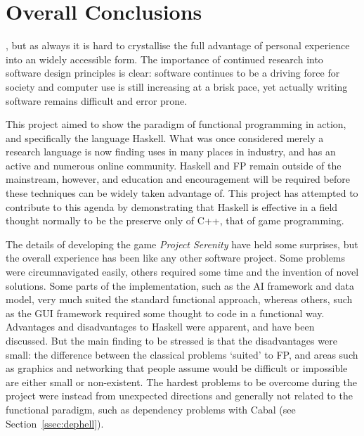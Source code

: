 \chapter[Overall Conclusions]{Overall Conclusions}
\label{ch:conclusions}


, but as always it is hard to crystallise the full advantage of personal experience into an widely accessible form. The importance of continued research into software design principles is clear: software continues to be a driving force for society and computer use is still increasing at a brisk pace,\cite{borodovsky2006marching} yet actually writing software remains difficult and error prone.\cite[1em]{paulk1993capability} 

This project aimed to show the paradigm of functional programming in action, and specifically the language Haskell. What was once considered merely a research language is now finding uses in many places in industry, and has an active and numerous online community. Haskell and FP remain outside of the mainstream, however, and education and encouragement will be required before these techniques can be widely taken advantage of. This project has attempted to contribute to this agenda by demonstrating that Haskell is effective in a field thought normally to be the preserve only of C++, that of game programming. 

The details of developing the game \emph{Project Serenity} have held some surprises, but the overall experience has been like any other software project. Some problems were circumnavigated easily, others required some time and the invention of novel solutions. Some parts of the implementation, such as the AI framework and data model, very much suited the standard functional approach, whereas others, such as the GUI framework required some thought to code in a functional way. Advantages and disadvantages to Haskell were apparent, and have been discussed. But the main finding to be stressed is that the disadvantages were small: the difference between the classical problems `suited' to FP, and areas such as graphics and networking that people assume would be difficult or impossible are either small or non-existent. The hardest problems to be overcome during the project were instead from unexpected directions and generally not related to the functional paradigm, such as dependency problems with Cabal (see Section~\ref{ssec:dephell}).

